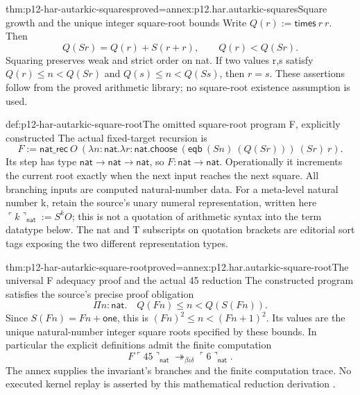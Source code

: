 \begin{hblemma}{thm:p12-har-autarkic-squares}{proved=annex:p12.har.autarkic-squares}{Square growth and the unique integer square-root bounds}
Write \(Q(r):=\mathsf{times}\ r\ r\). Then
\[
 Q(S r)=Q(r)+S(r+r),\qquad Q(r)<Q(S r).
\]
Squaring preserves weak and strict order on nat. If two values r,s
satisfy \(Q(r)\le n<Q(S r)\) and \(Q(s)\le n<Q(S s)\),
then \(r=s\). These assertions follow from the proved arithmetic
library; no square-root existence assumption is used.
\end{hblemma}

\begin{hbdefinition}{def:p12-har-autarkic-square-root}{The omitted square-root program F, explicitly constructed}
The actual fixed-target recursion is
\[
 F:=\mathsf{nat\_rec}\ O\
  (\lambda n:\mathsf{nat}.\lambda r:\mathsf{nat}.
     \mathsf{choose}\ (\mathsf{eqb}\ (S n)\ (Q(S r)))\ (S r)\ r).
\]
Its step has type \(\mathsf{nat}\to\mathsf{nat}\to\mathsf{nat}\),
so \(F:\mathsf{nat}\to\mathsf{nat}\). Operationally it increments
the current root exactly when the next input reaches the next square.
All branching inputs are computed natural-number data.
For a meta-level natural number k, retain the source's unary numeral
representation, written here
\(\ulcorner k\urcorner_{\mathsf{nat}}:=S^k O\);
this is not a quotation of arithmetic syntax into the term datatype below.
The nat and T subscripts on quotation brackets are editorial sort tags
exposing the two different representation types.
\end{hbdefinition}

\begin{hbtheorem}{thm:p12-har-autarkic-square-root}{proved=annex:p12.har.autarkic-square-root}{The universal F adequacy proof and the actual 45 reduction}
The constructed program satisfies the source's precise proof obligation
\[
 \Pi n:\mathsf{nat}.\quad Q(F n)\le n<Q(S(F n)).
\]
Since \(S(F n)=F n+\mathsf{one}\), this is
\((F n)^2\le n<(F n+1)^2\). Its values are the unique natural-number
integer square roots specified by these bounds. In particular the
explicit definitions admit the finite computation
\[
 F\ulcorner45\urcorner_{\mathsf{nat}}
     \twoheadrightarrow_{\beta\iota\delta}
          \ulcorner6\urcorner_{\mathsf{nat}}.
\]
The annex supplies the invariant's branches and the finite computation
trace. No executed kernel replay is asserted by this mathematical
reduction derivation \cite[p.~1221]{BarendregtGeuvers2001}.
\end{hbtheorem}

